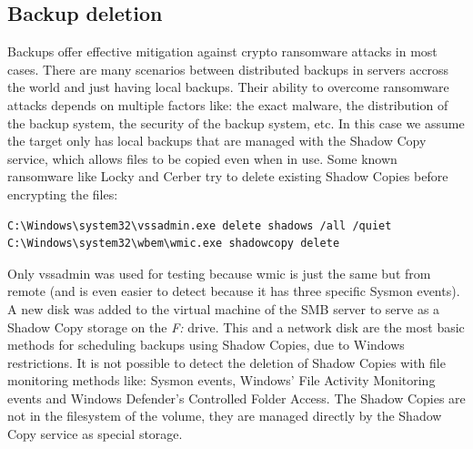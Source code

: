 \subsection{Backup deletion}
Backups offer effective mitigation against crypto ransomware attacks in most cases.
There are many scenarios between distributed backups in servers accross the world and just having local backups.
Their ability to overcome ransomware attacks depends on multiple factors like: the exact malware, the distribution of the backup system, the security of the backup system, etc.
\linej
In this case we assume the target only has local backups that are managed with the Shadow Copy service, which allows files to be copied even when in use.
Some known ransomware like Locky and Cerber try to delete existing Shadow Copies before encrypting the files\cite{ransomware_oReilly}:
\begin{lstlisting}[style=PS]
C:\Windows\system32\vssadmin.exe delete shadows /all /quiet
C:\Windows\system32\wbem\wmic.exe shadowcopy delete
\end{lstlisting}
\linej
Only vssadmin was used for testing because wmic is just the same but from remote (and is even easier to detect because it has three specific Sysmon events).
A new disk was added to the virtual machine of the SMB server to serve as a Shadow Copy storage on the \textit{F:} drive.
This and a network disk are the most basic methods for scheduling backups using Shadow Copies, due to Windows restrictions.
\linej
\linej
It is not possible to detect the deletion of Shadow Copies with file monitoring methods like: Sysmon events, Windows' File Activity Monitoring events and Windows Defender's Controlled Folder Access.
The Shadow Copies are not in the filesystem of the volume, they are managed directly by the Shadow Copy service as special storage.



